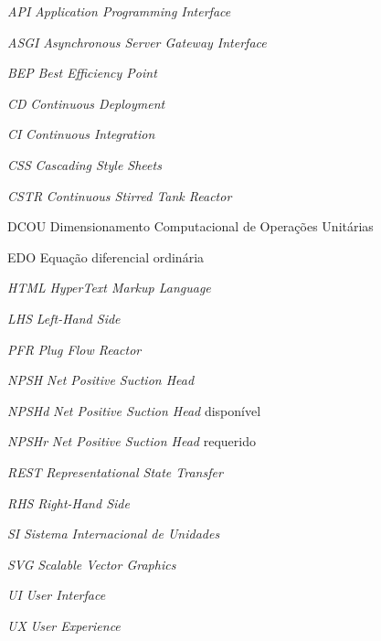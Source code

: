 \documentclass[
  12pt,        %
  openright,      %
  twoside,      %
  a4paper,      %
  english,      %
  brazil        %
  ]{abntex2}
\begin{document}
\begin{siglas}
  \item[\textit{API}] \textit{Application Programming Interface}
  \item[\textit{ASGI}] \textit{Asynchronous Server Gateway Interface}
  \item[\textit{BEP}] \textit{Best Efficiency Point}
  \item[\textit{CD}] \textit{Continuous Deployment}
  \item[\textit{CI}] \textit{Continuous Integration}
  \item[\textit{CSS}] \textit{Cascading Style Sheets}
  \item[\textit{CSTR}] \textit{Continuous Stirred Tank Reactor}
  \item[DCOU] Dimensionamento Computacional de Operações Unitárias
  \item[EDO] Equação diferencial ordinária
  \item[\textit{HTML}] \textit{HyperText Markup Language}
  \item[\textit{LHS}] \textit{Left-Hand Side}
  \item[\textit{PFR}] \textit{Plug Flow Reactor}
  \item[\textit{NPSH}] \textit{Net Positive Suction Head}
  \item[\textit{NPSHd}] \textit{Net Positive Suction Head} disponível
  \item[\textit{NPSHr}] \textit{Net Positive Suction Head} requerido
  \item[\textit{REST}] \textit{Representational State Transfer}
  \item[\textit{RHS}] \textit{Right-Hand Side}
  \item[\textit{SI}] \textit{Sistema Internacional de Unidades}
  \item[\textit{SVG}] \textit{Scalable Vector Graphics}
  \item[\textit{UI}] \textit{User Interface}
  \item[\textit{UX}] \textit{User Experience}
\end{siglas}
\cleardoublepage

\end{document}
